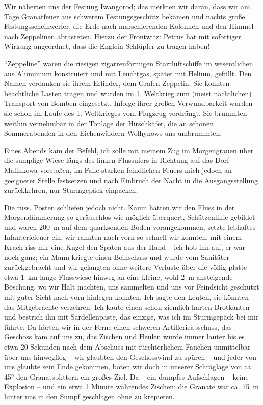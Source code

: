 Wir näherten uns der Festung Iwangorod; das merkten wir daran, dass wir am Tage Granatfeuer aus schwerem Festungsgeschütz bekamen und nachts große Festungsscheinwerfer, die Erde nach marschierenden Kolonnen und den Himmel nach Zeppelinen abtasteten. Hierzu der Frontwitz: Petrus hat mit sofortiger Wirkung angeordnet, dass die Englein Schlüpfer zu tragen haben!

\enquote{Zeppeline} waren die riesigen zigarrenförmigen Starrluftschiffe im wesentlichen aus Aluminium konstruiert und mit Leuchtgas, später mit Helium, gefüllt. Den Namen verdanken sie ihrem Erfinder, dem Grafen Zeppelin. Sie konnten beachtliche Lasten tragen und wurden im 1. Weltkrieg zum (meist nächtlichen) Transport von Bomben eingesetzt. Infolge ihrer großen Verwundbarkeit wurden sie schon im Laufe des 1. Weltkrieges vom Flugzeug verdrängt. Sie brummten weithin vernehmbar in der Tonlage der Hirschkäfer, die an schönen Sommerabenden in den Eichenwäldern Wolhynows uns umbrummten.

Eines Abends kam der Befehl, ich solle mit meinem Zug im Morgengrauen über die sumpfige Wiese längs des linken Flussufers in Richtung auf das Dorf Malinkowa vorstoßen, im Falle starken feindlichen Feuers mich jedoch an geeigneter Stelle festsetzen und nach Einbruch der Nacht in die Ausgangsstellung zurückkehren, nur Sturmgepäck einpacken.

Die russ. Posten schliefen jedoch nicht. Kaum hatten wir den Fluss in der Morgendämmerung so geräuschlos wie möglich überquert, Schützenlinie gebildet und waren 200~m auf dem quarksenden Boden vorangekommen, setzte lebhaftes Infanteriefeuer ein, wir rannten nach vorn so schnell wir konnten, mit einem Krach riss mir eine Kugel den Spaten aus der Hand -- ich hob ihn auf, er war noch ganz; ein Mann kriegte einen Beinschuss und wurde vom Sanitäter zurückgebracht und wir gelangten ohne weitere Verluste über die völlig platte etwa 1~km lange Flusswiese hinweg an eine kleine, wohl 2~m ansteigende Böschung, wo wir Halt machten, uns sammelten und uns vor Feindsicht geschützt mit guter Sicht nach vorn hinlegen konnten. Ich sagte den Leuten, sie könnten das Mitgebrachte verzehren. Ich kaute einen schon ziemlich harten Brotkanten und bestrich ihn mit Sardellenpaste, das einzige, was ich im Sturmgepäck bei mir führte. Da hörten wir in der Ferne einen schweren Artillerieabschuss, das Geschoss kam auf uns zu, das Zischen und Heulen wurde immer lauter bis es etwa 20 Sekunden nach dem Abschuss mit fürchterlichem Fauchen unmittelbar über uns hinwegflog -- wir glaubten den Geschosswind zu spüren -- und jeder von uns glaubte sein Ende gekommen, boten wir doch in unserer Schräglage von ca. 45° den Granatsplittern ein großes Ziel. Da -- ein dumpfes Aufschlagen -- keine Explosion -- und ein etwa 1 Minute währendes Zischen: die Granate war ca. 75~m hinter uns in den Sumpf geschlagen ohne zu krepieren.

